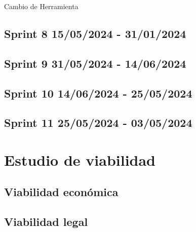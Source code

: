 Cambio de Herramienta

\subsection{Sprint 8 15/05/2024 - 31/01/2024}

\subsection{Sprint 9 31/05/2024 - 14/06/2024}

\subsection{Sprint 10 14/06/2024 - 25/05/2024}

\subsection{Sprint 11 25/05/2024 - 03/05/2024}



\section{Estudio de viabilidad}

\subsection{Viabilidad económica}

\subsection{Viabilidad legal}


